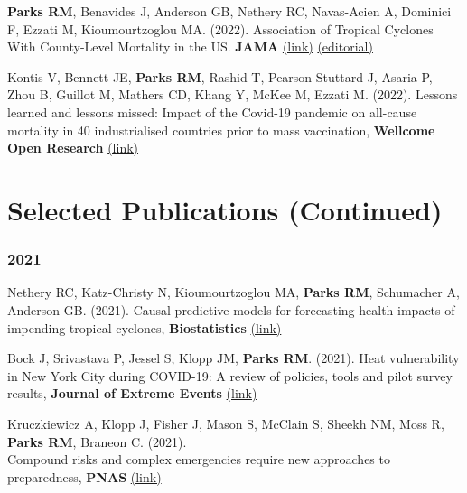 \noindent \textbf{Parks RM}, Benavides J, Anderson GB, Nethery RC, Navas-Acien A, Dominici F, Ezzati M, Kioumourtzoglou MA. (2022). Association of Tropical Cyclones With County-Level Mortality in the US. \textbf{JAMA} \href{https://jamanetwork.com/journals/jama/fullarticle/2789661}{(link)} \href{https://jamanetwork.com/journals/jama/fullarticle/2789676}{(editorial)} \smallskip

\noindent Kontis V, Bennett JE, \textbf{Parks RM}, Rashid T, Pearson-Stuttard J, Asaria P, Zhou B, Guillot M, Mathers CD, Khang Y, McKee M, Ezzati M. (2022). Lessons learned and lessons missed: Impact of the Covid-19 pandemic on all-cause mortality in 40 industrialised countries prior to mass vaccination, \textbf{Wellcome Open Research} \href{https://wellcomeopenresearch.org/articles/6-279/v2}{(link)} %


\newpage

\section*{Selected Publications (Continued)}

\subsubsection*{2021}

\noindent Nethery RC, Katz-Christy N, Kioumourtzoglou MA, \textbf{Parks RM}, Schumacher A, Anderson GB. (2021). Causal predictive models for forecasting health impacts of impending tropical cyclones, \textbf{Biostatistics} \href{https://academic.oup.com/biostatistics/advance-article/doi/10.1093/biostatistics/kxab047/6485226?guestAccessKey=378fb8f6-102d-4b21-a93d-b0a01353c19f#}{(link)} \smallskip

\noindent Bock J, Srivastava P, Jessel S, Klopp JM, \textbf{Parks RM}. (2021). Heat vulnerability in New York City during COVID-19: A review of policies, tools and pilot survey results, \textbf{Journal of Extreme Events} \href{https://www.worldscientific.com/doi/10.1142/S2345737621500159}{(link)} \smallskip

\noindent Kruczkiewicz A, Klopp J, Fisher J, Mason S, McClain S, Sheekh NM, Moss R, \textbf{Parks RM}, Braneon C. (2021).\\Compound risks and complex emergencies require new approaches to preparedness, \textbf{PNAS} \href{https://www.pnas.org/content/118/19/e2106795118}{(link)} \smallskip


